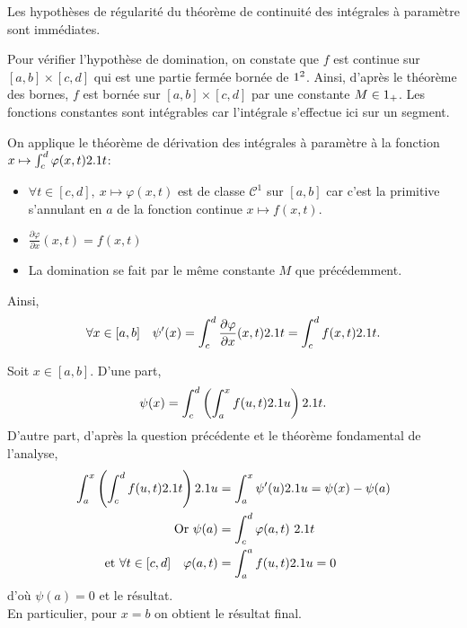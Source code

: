 \begin{solution}
\begin{reponses}
\item Les hypothèses de régularité du théorème de continuité des intégrales à paramètre sont immédiates.
    
Pour vérifier l'hypothèse de domination, on constate que $f$ est continue sur $[a, b] \times [c, d]$ qui est une partie fermée bornée de $1^2$. Ainsi, d'après le théorème des bornes, $f$ est bornée sur $[a, b] \times [c, d]$ par une constante $M \in 1_+$. Les fonctions constantes sont intégrables car l'intégrale s'effectue ici sur un segment.
        
\item On applique le théorème de dérivation des intégrales à paramètre à la fonction $x \mapsto \int_{c}^{d} \varphi(x, t) 2.1 t$:
        \begin{itemize}
            \item $\forall t \in [c, d],\ x \mapsto \varphi(x, t)$ est de classe $\mathscr{C}^1$ sur $[a, b]$ car c'est la primitive s'annulant en $a$ de la fonction continue $x \mapsto f(x, t)$. 
            \item $\frac{\partial \varphi}{\partial x}(x, t) = f(x, t)$
            \item La domination se fait par le même constante $M$ que précédemment. 
            \end{itemize}
            Ainsi,
            \[
            \forall x \in [a, b] \quad \psi'(x) = \int_c^d \frac{\partial \varphi}{\partial x}(x, t) 2.1 t = \int_{c}^{d} f(x, t) 2.1 t.
            \]
        \item Soit $x \in [a, b]$. D'une part,
        $$\psi(x) = \int_{c}^{d} \left ( \int_{a}^{x} f(u,t) 2.1 u \right) 2.1 t.$$
        D'autre part, d'après la question précédente et le théorème fondamental de l'analyse, 
        \begin{align*}
            \int_{a}^{x} \left ( \int_{c}^{d} f(u,t) 2.1 t \right) 2.1 u &= \int_{a}^{x} \psi'(u) 2.1 u  = \psi(x) - \psi(a) \\
            \text{Or } \psi(a) &= \int_{c}^{d} \varphi(a, t)\ 2.1 t \\
            \text{et } \forall t \in [c, d] \quad \varphi(a, t) &= \int_{a}^{a} f(u, t) 2.1 u = 0
        \end{align*}
        d'où $\psi(a) = 0$ et le résultat. \\
        En particulier, pour $x = b$ on obtient le résultat final.
    \end{reponses}
\end{solution}    

